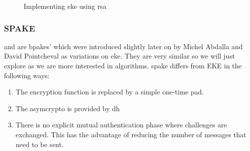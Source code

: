 \begin{figure}[H]

  \caption{Implementing \gls{eke} using \gls{rsa}}
  \label{fig:eke-rsa}
\end{figure}

\clearpage

\subsubsection{SPAKE}
 and  are \glspl{bpake}' which were introduced slightly later on by Michel Abdalla and David Pointcheval \cite{spake} as variations on \gls{eke}.
They are very similar so we will just explore  as we are more interested in  algorithms.
\gls{spake} differs from EKE in the following ways:

\begin{enumerate}
  \item The encryption function is replaced by a simple one-time pad.
  \item The \gls{asymcrypto} is provided by \gls{dh}
  \item There is no explicit mutual authentication phase where challenges are exchanged.
    This has the advantage of reducing the number of messages that need to be sent.
\end{enumerate}

